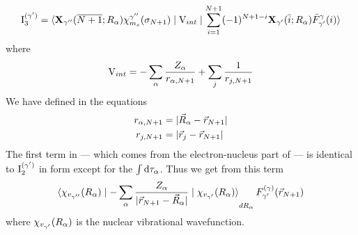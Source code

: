\documentclass[aps,pra,groupedaddress,12pt,
               amsfonts,amssymb,
               preprint
    ]{revtex4}
\begin{document}
\begin{enumerate}
  \begin{equation}
    \label{eq:intg3a}
  \mathrm{I}_3^{(\gamma')} =
  \mathinner{\langle{{\mathbf{X}_{\gamma''}(\overline{N+1};R_\alpha)\chi_{m_s}^{\gamma''}(\sigma_{N+1})} \mid {\mathrm{V}_{int}} \mid {\sum_{i=1}^{N+1}(-1)^{N+1-i}\mathbf{X}_{\gamma'}(\bar{i};R_\alpha)\bar{F}_{\gamma'}^{\gamma}(i)}}\rangle} 
  \end{equation}
where
\begin{equation}
  \label{eq:vintem}
  \mathrm{V}_{int} = -\sum_\alpha\dfrac{Z_\alpha}{r_{\alpha,N+1}} + \sum_j\dfrac{1}{r_{j,N+1}}
\end{equation}
We have defined in  the equations
\begin{subequations}
  \begin{align}
    \label{eq:rem}
    r_{\alpha,N+1} &= |\vec{R}_\alpha - \vec{r}_{N+1}| \\
    r_{j,N+1} &= |\vec{r}_{j} - \vec{r}_{N+1}|
  \end{align} 
\end{subequations}
The first term in  --- which comes from the electron-nucleus
part of  --- is identical to $\mathrm{I}_2^{(\gamma')}$ in form except
for the $\int\mathrm{d}\tau_\alpha$. Thus we get from this term
\begin{equation}
  \label{eq:intg3b}
  \mathinner{\langle{{\chi_{v_{\gamma''}}(R_\alpha)} \mid {-\sum_\alpha\dfrac{Z_\alpha}{|\vec{r}_{N+1}-\vec{R}_\alpha|}} \mid {\chi_{v_{\gamma'}}(R_\alpha)}}\rangle}_{dR_\alpha}F_{\gamma'}^{(\gamma)}(\vec{r}_{N+1})
\end{equation}
where $\chi_{v_{\gamma'}}(R_\alpha)$ is the nuclear vibrational wavefunction.


\end{enumerate}
\end{document}
